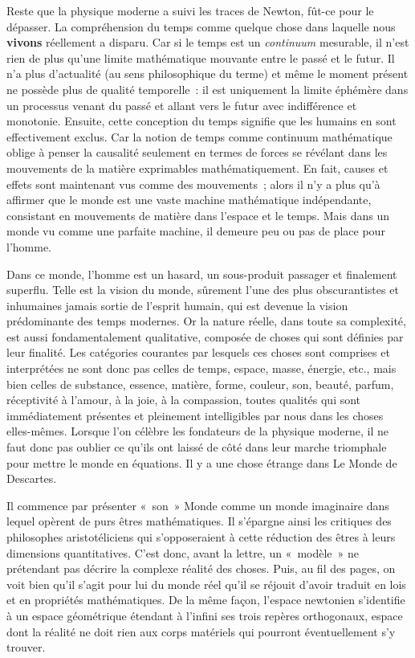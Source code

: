 \documentclass[a4paper,12pt]{article}
\begin{document}
Reste que la physique moderne a suivi les traces de Newton, fût-ce pour le dépasser. La compréhension du temps comme quelque chose dans laquelle nous  \textbf{vivons} réellement a disparu. Car si le temps est un  \textit{continuum} mesurable, il n'est rien de plus qu'une limite mathématique mouvante entre le passé et le futur. Il n'a plus d'actualité (au sens philosophique du terme) et même le moment présent ne possède plus de qualité temporelle : il est uniquement la limite éphémère dans un processus venant du passé et allant vers le futur avec indifférence et monotonie. Ensuite, cette conception du temps signifie que les humains en sont effectivement exclus. Car la notion de temps comme continuum mathématique oblige à penser la causalité seulement en termes de forces se révélant dans les mouvements de la matière exprimables mathématiquement. En fait, causes et effets sont maintenant vus comme des mouvements ; alors il n'y a plus qu'à affirmer que le monde est une vaste machine mathématique indépendante, consistant en mouvements de matière dans l'espace et le temps. Mais dans un monde vu comme une parfaite machine, il demeure peu ou pas de place pour l'homme.

Dans ce monde, l'homme est un hasard, un sous-produit passager et finalement superflu. Telle est la vision du monde, sûrement l'une des plus obscurantistes et inhumaines jamais sortie de l'esprit humain, qui est devenue la vision prédominante des temps modernes. Or la nature réelle, dans toute sa complexité, est aussi fondamentalement qualitative, composée de choses qui sont définies par leur finalité. Les catégories courantes par lesquels ces choses sont comprises et interprétées ne sont donc pas celles de temps, espace, masse, énergie, etc., mais bien celles de substance, essence, matière, forme, couleur, son, beauté, parfum, réceptivité à l'amour, à la joie, à la compassion, toutes qualités qui sont immédiatement présentes et pleinement intelligibles par nous dans les choses elles-mêmes. Lorsque l’on célèbre les fondateurs de la physique moderne, il ne faut donc pas oublier ce qu’ils ont laissé de côté dans leur marche triomphale pour mettre le monde en équations. Il y a une chose étrange dans Le Monde de Descartes. 

Il commence par présenter « son » Monde comme un monde imaginaire dans lequel opèrent de purs êtres mathématiques. Il s'épargne ainsi les critiques des philosophes aristotéliciens qui s'opposeraient à cette réduction des êtres à leurs dimensions quantitatives. C'est donc, avant la lettre, un « modèle » ne prétendant pas décrire la complexe réalité des choses. Puis, au fil des pages, on voit bien qu'il s'agit pour lui du monde réel qu’il se réjouit d'avoir traduit en lois et en propriétés mathématiques. De la même façon, l'espace newtonien s'identifie à un espace géométrique étendant à l'infini ses trois repères orthogonaux, espace dont la réalité ne doit rien aux corps matériels qui pourront éventuellement s’y trouver.
\end{document}
